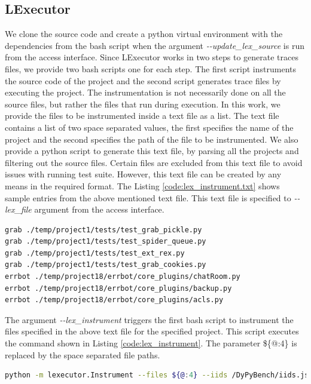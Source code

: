 \subsection{LExecutor}
We clone the source code and create a python virtual environment with the dependencies from the bash script when the argument \textit{\--\--update\_lex\_source} is run from the access interface.
Since LExecutor works in two steps to generate traces files, we provide two bash scripts one for each step.
The first script instruments the source code of the project and the second script generates trace files by executing the project.  
The instrumentation is not necessarily done on all the source files, but rather the files that run during execution.
In this work, we provide the files to be instrumented inside a text file as a list.
The text file contains a list of two space separated values, the first specifies the name of the project and the second specifies the path of the file to be instrumented.
We also provide a python script to generate this text file, by parsing all the projects and filtering out the source files.
Certain files are excluded from this text file to avoid issues with running test suite.
However, this text file can be created by any means in the required format.
The Listing \ref{code:lex_instrument.txt} shows sample entries from the above mentioned text file.
This text file is specified to \textit{\--\--lex\_file} argument from the access interface.
\begin{lstlisting}[caption=lex\_instrument\_all.txt,label=code:lex_instrument.txt,language=Bash]
grab ./temp/project1/tests/test_grab_pickle.py
grab ./temp/project1/tests/test_spider_queue.py
grab ./temp/project1/tests/test_ext_rex.py
grab ./temp/project1/tests/test_grab_cookies.py
errbot ./temp/project18/errbot/core_plugins/chatRoom.py
errbot ./temp/project18/errbot/core_plugins/backup.py
errbot ./temp/project18/errbot/core_plugins/acls.py
\end{lstlisting}

The argument \textit{\--\--lex\_instrument} triggers the first bash script to instrument the files specified in the above text file for the specified project.
This script executes the command shown in Listing \ref{code:lex_instrument}.
The parameter \$\{@:4\} is replaced by the space separated file paths. 
\begin{lstlisting}[caption=LExecutor Instrumentation,label=code:lex_instrument,language=Bash]
python -m lexecutor.Instrument --files ${@:4} --iids /DyPyBench/iids.json --validate
\end{lstlisting}

